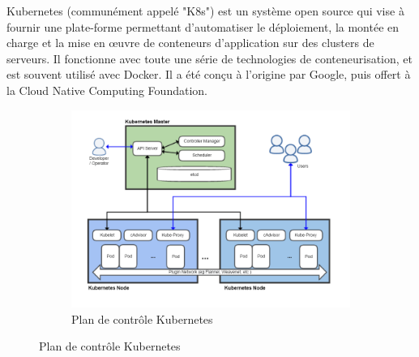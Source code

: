 \documentclass{article}
\begin{document}
Kubernetes (communément appelé "K8s") est un système open source qui vise à fournir une plate-forme permettant d'automatiser le déploiement, la montée en charge et la mise en œuvre de conteneurs d'application sur des clusters de serveurs. Il fonctionne avec toute une série de technologies de conteneurisation, et est souvent utilisé avec Docker. Il a été conçu à l'origine par Google, puis offert à la Cloud Native Computing Foundation. 
\newline
\begin{figure}[h!]
	\centering
  	\begin{subfigure}[b]{1.0\linewidth}
	\includegraphics[width=\linewidth]{Kubernetes.png}
	\caption{Plan de contrôle Kubernetes}
  	\end{subfigure}
\end{figure}
\end{document}

